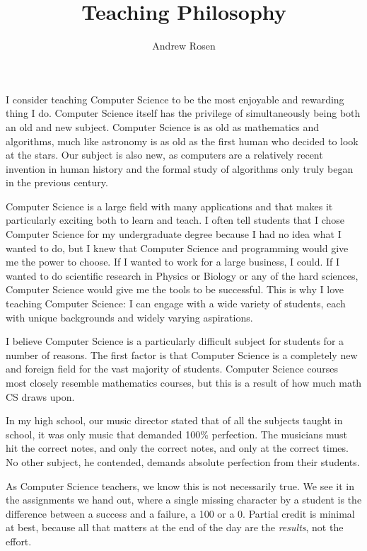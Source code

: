 \documentclass[10pt, a4paper]{article}
\author{Andrew Rosen}
\title{Teaching Philosophy}
\date{}
\begin{document}
\maketitle
	
I consider teaching Computer Science to be the most enjoyable and rewarding thing I do.
Computer Science itself has the privilege of simultaneously being both an old and new subject.
Computer Science is as old as mathematics and algorithms, much like astronomy is as old as the first human who decided to look at the stars.
Our subject is also new, as computers are a relatively recent invention in human history and the formal study of algorithms only truly began in the previous century.


Computer Science is a large field with many applications and that makes it particularly exciting both to learn and teach.
I often tell students that I chose Computer Science for my undergraduate degree because I had no idea what I wanted to do, but I knew that Computer Science and programming would give me the power to choose.
If I wanted to work for a large business, I could.
If I wanted to do scientific research in Physics or Biology or any of the hard sciences, Computer Science would give me the tools to be successful.
This is why I love teaching Computer Science:  I can engage with a wide variety of students, each with unique backgrounds and widely varying aspirations.




I believe Computer Science is a particularly difficult subject for students for a number of reasons.
The first factor is that Computer Science is a completely new and foreign field for the vast majority of students.
Computer Science courses most closely resemble mathematics courses, but this is a result of how much math CS draws upon.

In my high school, our music director stated that of all the subjects taught in school, it was only music that demanded 100\% perfection.
The musicians must hit the correct notes, and only the correct notes, and only at the correct times.
No other subject, he contended, demands absolute perfection from their students.

As Computer Science teachers, we know this is not necessarily true. 
We see it in the assignments we hand out, where a single missing character by a student is the difference between a success and a failure, a 100 or a 0.
Partial credit is minimal at best, because all that matters at the end of the day are the \textit{results}, not the effort.
\end{document}
